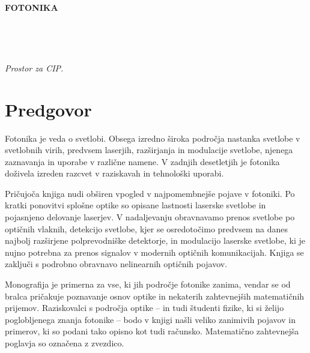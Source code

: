 \documentclass[a4paper,10pt,fleqn]{book}
\begin{document}

\strut
\vfill
\thispagestyle{empty}
\centerline{\textbf{FOTONIKA}}


\lihastran~
\thispagestyle{empty}
\vfill\vfill
{}
\vfill
{}
\vfill\vfill\vfill
\vfill
{}


\sodastran~
\thispagestyle{empty}

\vfill
\begin{CIP}
   \emph{Prostor za CIP.}
\end{CIP}


\lihastran
\thispagestyle{plain}

\chapter*{Predgovor}
Fotonika je veda o svetlobi. Obsega izredno široka področja nastanka svetlobe
v svetlobnih virih, predvsem laserjih, razširjanja in modulacije svetlobe,
njenega zaznavanja in uporabe v različne namene. V zadnjih 
desetletjih je fotonika doživela izreden razcvet v raziskavah in 
tehnološki uporabi.

Pričujoča knjiga nudi obširen vpogled v najpomembnejše pojave v fotoniki.
Po kratki ponovitvi splošne optike so opisane lastnosti laserske svetlobe
in pojasnjeno delovanje laserjev. V nadaljevanju obravnavamo prenos
svetlobe po optičnih vlaknih, detekcijo svetlobe, kjer se osredotočimo 
predvsem na danes najbolj razširjene polprevodniške detektorje, in 
modulacijo laserske svetlobe, ki je nujno potrebna za prenos signalov
v modernih optičnih komunikacijah. Knjiga se zaključi s podrobno obravnavo 
nelinearnih optičnih pojavov. 

Monografija je primerna za vse, ki jih področje fotonike zanima, 
vendar se od bralca pričakuje poznavanje osnov optike in nekaterih 
zahtevnejših matematičnih prijemov. Raziskovalci s področja optike 
-- in tudi študenti fizike, ki si želijo poglobljenega znanja fotonike -- 
bodo v knjigi našli veliko zanimivih pojavov in primerov, ki so podani tako opisno kot tudi 
računsko. Matematično zahtevnejša poglavja so označena z zvezdico.
\end{document}
